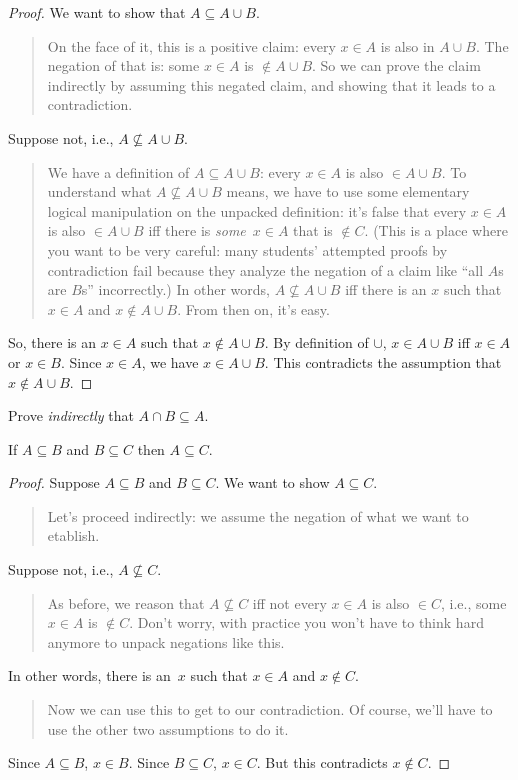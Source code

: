 \documentclass[../../../include/open-logic-section]{subfiles}
\begin{document}
\begin{proof}
  We want to show that $A \subseteq A \cup B$.
  \begin{quote}
    On the face of it, this is a positive claim: every $x \in A$ is
    also in $A \cup B$.  The negation of that is: some $x \in A$ is
    $\notin A \cup B$. So we can prove the claim indirectly by
    assuming this negated claim, and showing that it leads to a
    contradiction.
    \end{quote}
  Suppose not, i.e., $A \nsubseteq A \cup B$.
  \begin{quote}
    We have a definition of $A \subseteq A \cup B$: every $x \in A$ is
    also $\in A \cup B$.  To understand what $A \nsubseteq A \cup B$
    means, we have to use some elementary logical manipulation on the
    unpacked definition: it's false that every $x \in A$ is also $\in
    A \cup B$ iff there is \emph{some}~$x \in A$ that is $\notin C$.
    (This is a place where you want to be very careful: many students'
    attempted proofs by contradiction fail because they analyze the
    negation of a claim like ``all $A$s are $B$s'' incorrectly.) In
    other words, $A \nsubseteq A \cup B$ iff there is an $x$ such that
    $x \in A$ and $x \notin A \cup B$. From then on, it's easy.
  \end{quote}
  So, there is an $x \in A$ such that $x \notin A \cup B$.  By
  definition of $\cup$, $x \in A \cup B$ iff $x \in A$ or $x \in
  B$. Since $x \in A$, we have $x \in A \cup B$. This contradicts the
  assumption that $x \notin A \cup B$. 
\end{proof}

\begin{prob}
Prove \emph{indirectly} that $A \cap B \subseteq A$.
\end{prob}

\begin{prop}
If $A \subseteq B$ and $B \subseteq C$ then $A \subseteq C$.
\end{prop}

\begin{proof}
  Suppose $A \subseteq B$ and $B \subseteq C$. We want to show $A
  \subseteq C$.
  \begin{quote}
    Let's proceed indirectly: we assume the negation of what we want
    to etablish.
  \end{quote}
  Suppose not, i.e., $A \nsubseteq C$.
  \begin{quote}
    As before, we reason that $A \nsubseteq C$ iff not every $x \in A$
    is also $\in C$, i.e., some $x \in A$ is $\notin C$.  Don't worry,
    with practice you won't have to think hard anymore to unpack
    negations like this.
  \end{quote}
  In other words, there is an~$x$ such that $x \in A$ and $x \notin C$.
  \begin{quote}
    Now we can use this to get to our contradiction. Of course, we'll
    have to use the other two assumptions to do it.
  \end{quote}
  Since $A \subseteq B$, $x \in B$. Since $B \subseteq C$, $x \in
  C$. But this contradicts $x \notin C$.
\end{proof}
\end{document}

